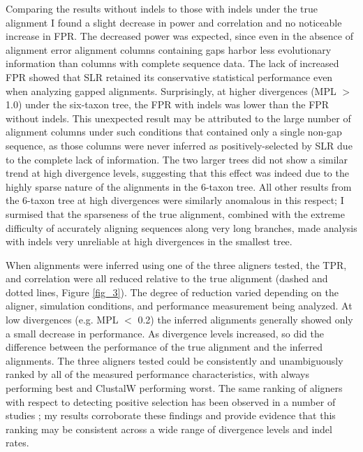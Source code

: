 Comparing the results without indels to those with indels under the
true alignment I found a slight decrease in power and \omg
correlation and no noticeable increase in FPR. The decreased power was
expected, since even in the absence of alignment error alignment
columns containing gaps harbor less evolutionary information than
columns with complete sequence data. The lack of increased FPR showed
that SLR retained its conservative statistical performance even when
analyzing gapped alignments. Surprisingly, at higher divergences (MPL
$>$ 1.0) under the six-taxon tree, the FPR with indels was lower than
the FPR without indels. This unexpected result may be attributed to
the large number of alignment columns under such conditions that
contained only a single non-gap sequence, as those columns were never
inferred as positively-selected by SLR due to the complete lack of
information. The two larger trees did not show a similar trend at high
divergence levels, suggesting that this effect was indeed due to the
highly sparse nature of the alignments in the 6-taxon tree. All other
results from the 6-taxon tree at high divergences were similarly
anomalous in this respect; I surmised that the sparseness of the true
alignment, combined with the extreme difficulty of accurately aligning
sequences along very long branches, made \sw analysis with indels very
unreliable at high divergences in the smallest tree.

When alignments were inferred using one of the three aligners tested,
the TPR, \tpr{} and \omg correlation were all reduced relative to
the true alignment (dashed and dotted lines, Figure \ref{fig_3}). The
degree of reduction varied depending on the aligner, simulation
conditions, and performance measurement being analyzed. At low
divergences (e.g. MPL $<$ 0.2) the inferred alignments generally
showed only a small decrease in performance. As divergence levels
increased, so did the difference between the performance of the true
alignment and the inferred alignments. The three aligners tested could
be consistently and unambiguously ranked by all of the measured
performance characteristics, with \prankc always performing best and
ClustalW performing worst. The same ranking of aligners with respect
to detecting positive selection has been observed in a number of
studies
\citep{Fletcher2010,MarkovaRaina2011,Privman2011Improving};
my results corroborate these findings and provide evidence that this
ranking may be consistent across a wide range of divergence levels and
indel rates.

